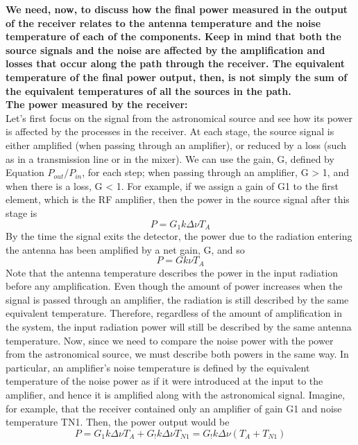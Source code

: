 \documentclass[10pt]{report}
\begin{document}
\textbf{ We need, now, to discuss how the final power measured in the output of the receiver relates to the antenna temperature and the noise temperature of each of the components.  Keep in mind that both the source signals and the noise are affected by the amplification and losses that occur along the path through the receiver.  The equivalent temperature of the final power output, then, is not simply the sum of the equivalent temperatures of all the sources in the path. 
 }\\
 \textbf{The power measured by the receiver:}\\
 Let's first focus on the signal from the astronomical source and see how its power is affected by the processes in the receiver.  At each stage, the source signal is either amplified (when passing through an amplifier), or reduced by a loss (such as in a transmission line or in the mixer).  We can use the gain, G, defined by Equation $P_{out}/P_{in}$, for each step; when passing through an amplifier, G > 1, and when there is a loss, G < 1.  For example, if we assign a gain of G1 to the first element, which is the RF amplifier, then the power in the source signal after this stage is 
 \begin{equation*}
 P=G_1 k\Delta \nu T_A
 \end{equation*}
By the time the signal exits the detector, the power due to the radiation entering the antenna has been amplified by a net gain, G, and so 
\begin{equation}
P=Gk\nu T_A
\end{equation}
Note that the antenna temperature describes the power in the input radiation before any amplification.  Even though the amount of power increases when the signal is passed through an amplifier, the radiation is still described by the same equivalent temperature.  Therefore, regardless of the amount of amplification in the system, the input radiation power will still be described by the same antenna temperature.  Now, since we need to compare the noise power with the power from the astronomical source, we must describe both powers in the same way.  In particular, an amplifier's noise temperature is defined by the equivalent temperature of the noise power as if it were introduced at the input to the amplifier, and hence it is amplified along with the astronomical signal.  Imagine, for example, that the receiver contained only an amplifier of gain G1 and noise temperature TN1.  Then, the power output would be 
\begin{equation*}
P=G_1k \Delta \nu T_A +G_!k \Delta \nu T_{N1}=G_!k \Delta \nu (T_A+T_{N1})
\end{equation*}
\end{document}
